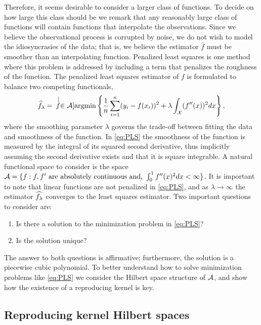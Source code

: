 Therefore, it seems desirable to consider a larger class of functions. To decide on how large this class should be we remark that any reasonably large class of functions will contain functions that interpolate the observations. Since we believe the observational process is corrupted by noise, we do not wish to model the idiosyncrasies of the data; that is,  we believe the estimator $\hat{f}$ must be smoother than an interpolating function. Penalized least squares is one method where this problem is addressed by including a term that penalizes the roughness of the function. The penalized least squares estimator of $f$ is formulated to balance two competing functionals, 
\begin{equation}
\widehat{f}_{\lambda} = \hspace{.07in}\stackrel[f \in \mathcal{A}]{}{\mbox{argmin}} \left\{ \frac{1}{n}\sum_{i=1}^{n}(y_i - f(x_i))^2 + \lambda\int_{\mathcal{X}}(f''(x))^2dx \right\},
\label{eq:PLS}
\end{equation}
where the smoothing parameter $\lambda$ governs the trade-off between fitting the data and smoothness of the function. In \eqref{eq:PLS} the smoothness of the function is measured by the integral of its squared second derivative, thus implicitly assuming the second derivative exists and that it is square integrable. A natural functional space to consider is the space $\mathcal{A} = \{f: f, f' \mbox{ are absolutely continuous and, } \int_0^1f''(x)^2dx <\infty\}$. It is important to note that linear functions are not penalized in \eqref{eq:PLS}, and as $\lambda \rightarrow \infty$ the estimator $\widehat{f_{\lambda}}$ converges to the least squares estimator. Two important questions to consider are: 
\begin{enumerate}
	\item Is there a solution to the minimization problem in \eqref{eq:PLS}?
	\item Is the solution unique?
\end{enumerate}
The answer to both questions is affirmative; furthermore, the solution is a piecewise cubic polynomial.  To better understand how to solve minimization problems like \eqref{eq:PLS} we consider the Hilbert space structure of $\mathcal{A}$, and show how the existence of a reproducing kernel is key. 
 

\subsection{Reproducing kernel Hilbert spaces}

